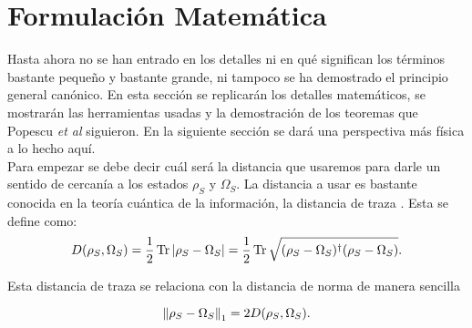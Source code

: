\section{Formulación Matemática}

Hasta ahora no se han entrado en los detalles ni en qué significan los términos bastante pequeño y bastante grande, ni tampoco se ha demostrado el principio general canónico. En esta sección se replicarán los detalles matemáticos, se mostrarán las herramientas usadas y la demostración de los teoremas que Popescu \textit{et al} siguieron. En la siguiente sección se dará una perspectiva más física a lo hecho aquí.
\\
Para empezar se debe decir cuál será la distancia que usaremos para darle un sentido de cercanía a los estados $\rho_{S}$ y $\Omega_{S}$. La distancia a usar es bastante conocida en la teoría cuántica de la información, la distancia de traza \cite{NielsenInformation}. Esta se define como:
\begin{equation}
D(\rho_{S}, \Omega_{S})= \frac{1}{2} \Tr |\rho_{S} -\Omega_{S}|=\frac{1}{2} \Tr \sqrt{(\rho_{S} -\Omega_{S})^{\dag}(\rho_{S} -\Omega_{S})}.
\end{equation}

Esta distancia de traza se relaciona con la distancia de norma de manera sencilla

\begin{equation}
\norm{\rho_{S}-\Omega_{S}}_{1}=2 D(\rho_{S}, \Omega_{S}).
\end{equation}

